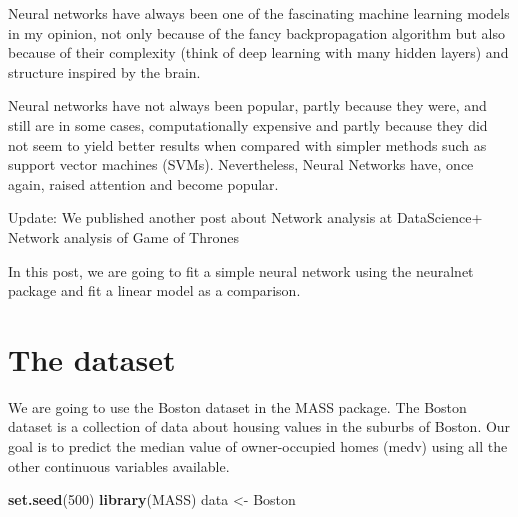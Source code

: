 \documentclass[]{book}
\newenvironment{Shaded}{\begin{snugshade}}{\end{snugshade}}
\newcommand{\DecValTok}[1]{\textcolor[rgb]{0.00,0.00,0.81}{#1}}
\newcommand{\KeywordTok}[1]{\textcolor[rgb]{0.13,0.29,0.53}{\textbf{#1}}}
\newcommand{\NormalTok}[1]{#1}
\newcommand{\StringTok}[1]{\textcolor[rgb]{0.31,0.60,0.02}{#1}}
\begin{document}
Neural networks have always been one of the fascinating machine learning models in my opinion, not only because of the fancy backpropagation algorithm but also because of their complexity (think of deep learning with many hidden layers) and structure inspired by the brain.

Neural networks have not always been popular, partly because they were, and still are in some cases, computationally expensive and partly because they did not seem to yield better results when compared with simpler methods such as support vector machines (SVMs). Nevertheless, Neural Networks have, once again, raised attention and become popular.

Update: We published another post about Network analysis at DataScience+ Network analysis of Game of Thrones

In this post, we are going to fit a simple neural network using the neuralnet package and fit a linear model as a comparison.

\hypertarget{the-dataset-1}{%
\section{The dataset}\label{the-dataset-1}}

We are going to use the Boston dataset in the MASS package.
The Boston dataset is a collection of data about housing values in the suburbs of Boston. Our goal is to predict the median value of owner-occupied homes (medv) using all the other continuous variables available.

\begin{Shaded}
\begin{Highlighting}[]
\KeywordTok{set.seed}\NormalTok{(}\DecValTok{500}\NormalTok{)}
\KeywordTok{library}\NormalTok{(MASS)}
\NormalTok{data <-}\StringTok{ }\NormalTok{Boston}
\end{Highlighting}
\end{Shaded}
\end{document}
